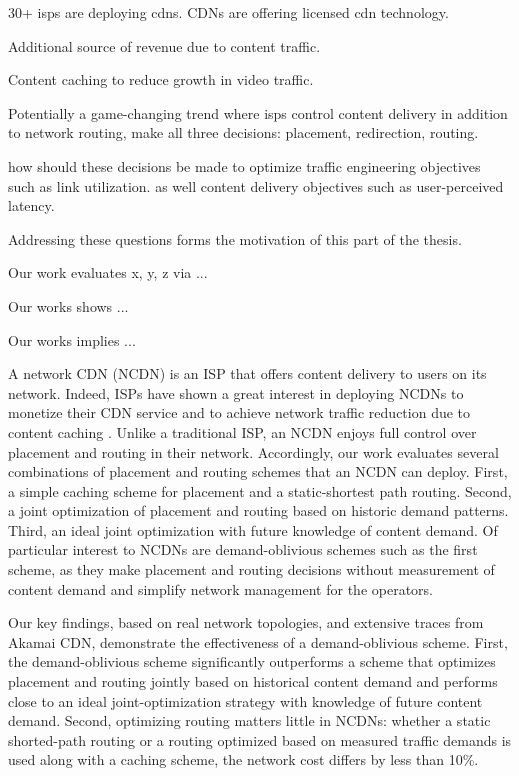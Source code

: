 30+ isps are deploying cdns. CDNs are offering licensed cdn technology.

Additional source of revenue due to content traffic.

Content caching to reduce growth in video traffic.

Potentially a game-changing trend where isps control content delivery in addition to network routing, make all three decisions: placement, redirection, routing.

how should these decisions be made to optimize traffic engineering objectives such as link utilization. as well content delivery objectives such as user-perceived latency.

Addressing these questions forms the motivation of this part of the thesis.

Our work evaluates x, y, z via ... 

Our works shows ...

Our works implies ...

A network CDN (NCDN) is an ISP that offers content delivery to users on its network. Indeed, ISPs have shown a great interest in deploying NCDNs to monetize their CDN service and to achieve network traffic reduction due to content caching \cite{telco-cdn-arguments}. Unlike a traditional ISP, an NCDN enjoys full control over placement and routing in their network. Accordingly, our work evaluates several combinations of placement and routing schemes that an NCDN can deploy. First, a simple caching scheme for placement and a static-shortest path routing. Second, a joint optimization of placement and routing based on historic demand patterns. Third,  an ideal joint optimization with future knowledge of content demand.  Of particular interest to NCDNs are demand-oblivious schemes such as the first scheme, as they make placement and routing decisions without measurement of content demand and simplify network management for the operators. 

Our key findings, based on real network topologies, and extensive traces from Akamai CDN, demonstrate the effectiveness of a demand-oblivious scheme. First, the demand-oblivious scheme significantly outperforms a scheme that optimizes placement and routing jointly based on historical content demand and performs close to an ideal joint-optimization strategy with knowledge of future content demand.  Second, optimizing routing matters little in NCDNs: whether a static shorted-path routing or a routing optimized based on measured traffic demands is used along with a caching scheme, the network cost differs by less than 10\%. 

